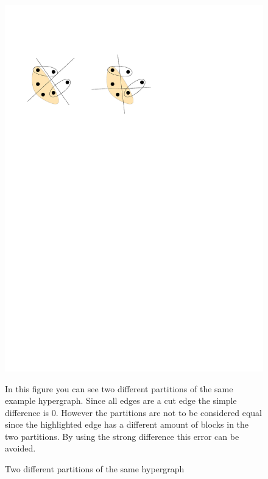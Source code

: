 \documentclass[a4paper,12pt,bibtotoc,titlepage, liststotoc,BCOR7mm,headsepline,pointlessnumbers]{scrbook}
\numberwithin{equation}{section}
\begin{document}
\begin{figure}[H] 

    \vspace*{-.25cm}
  \begin{center}
   \includegraphics[width=.8\textwidth]{Ipe/connexample.pdf}
  \caption{Two different partitions of the same hypergraph}\label{fig:img.png} 
  \label{fig:diversity}
  \end{center}
  In this figure you can see two different partitions of the same example hypergraph. Since all edges are a cut edge the simple difference is 0. However the partitions are not to be considered equal since the highlighted edge has 
  a different amount of blocks in the two partitions. By using the strong difference this error can be avoided. 
\end{figure}
\end{document}
